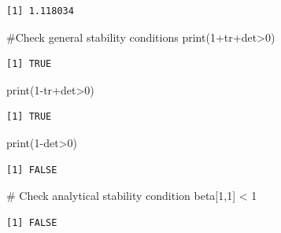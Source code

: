 \documentclass[
  letterpaper,
  DIV=11,
  numbers=noendperiod]{scrreprt}
\newenvironment{Shaded}{\begin{snugshade}}{\end{snugshade}}
\newcommand{\CommentTok}[1]{\textcolor[rgb]{0.37,0.37,0.37}{#1}}
\newcommand{\DecValTok}[1]{\textcolor[rgb]{0.68,0.00,0.00}{#1}}
\newcommand{\FunctionTok}[1]{\textcolor[rgb]{0.28,0.35,0.67}{#1}}
\newcommand{\NormalTok}[1]{\textcolor[rgb]{0.00,0.23,0.31}{#1}}
\newcommand{\SpecialCharTok}[1]{\textcolor[rgb]{0.37,0.37,0.37}{#1}}
\begin{document}
\begin{verbatim}
[1] 1.118034
\end{verbatim}

\begin{Shaded}
\begin{Highlighting}[]
\CommentTok{\#Check general stability conditions}
\FunctionTok{print}\NormalTok{(}\DecValTok{1}\SpecialCharTok{+}\NormalTok{tr}\SpecialCharTok{+}\NormalTok{det}\SpecialCharTok{\textgreater{}}\DecValTok{0}\NormalTok{)}
\end{Highlighting}
\end{Shaded}

\begin{verbatim}
[1] TRUE
\end{verbatim}

\begin{Shaded}
\begin{Highlighting}[]
\FunctionTok{print}\NormalTok{(}\DecValTok{1}\SpecialCharTok{{-}}\NormalTok{tr}\SpecialCharTok{+}\NormalTok{det}\SpecialCharTok{\textgreater{}}\DecValTok{0}\NormalTok{)}
\end{Highlighting}
\end{Shaded}

\begin{verbatim}
[1] TRUE
\end{verbatim}

\begin{Shaded}
\begin{Highlighting}[]
\FunctionTok{print}\NormalTok{(}\DecValTok{1}\SpecialCharTok{{-}}\NormalTok{det}\SpecialCharTok{\textgreater{}}\DecValTok{0}\NormalTok{)}
\end{Highlighting}
\end{Shaded}

\begin{verbatim}
[1] FALSE
\end{verbatim}

\begin{Shaded}
\begin{Highlighting}[]
\CommentTok{\# Check analytical stability condition}
\NormalTok{beta[}\DecValTok{1}\NormalTok{,}\DecValTok{1}\NormalTok{] }\SpecialCharTok{\textless{}} \DecValTok{1}
\end{Highlighting}
\end{Shaded}

\begin{verbatim}
[1] FALSE
\end{verbatim}
\end{document}
